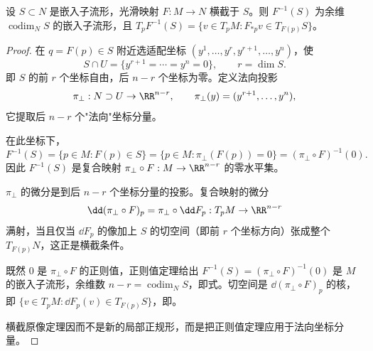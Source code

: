 \begin{theorem}[横截原像定理]
设 $S\subset N$ 是嵌入子流形，光滑映射 $F:M\to N$ 横截于 $S$。则 $F^{-1}(S)$ 为余维 $\operatorname{codim}_N S$ 的嵌入子流形，且 $T_pF^{-1}(S)=\{v\in T_pM:F_{*p}v\in T_{F(p)}S\}$。
\end{theorem}
\begin{proof}
在 $q=F(p)\in S$ 附近选适配坐标 $(y^1,\ldots,y^r,y^{r+1},\ldots,y^n)$，使
\begin{equation*}
 S\cap U=\{y^{r+1}=\cdots=y^n=0\},
 \qquad r=\dim S.
\end{equation*}
即 $S$ 的前 $r$ 个坐标自由，后 $n-r$ 个坐标为零。定义法向投影
\begin{equation*}
 \pi_\perp:N\supset U\to\RR^{n-r},
 \qquad
 \pi_\perp(y)=(y^{r+1},\ldots,y^n),
\end{equation*}
它提取后 $n-r$ 个"法向"坐标分量。

在此坐标下，
\begin{equation*}
 F^{-1}(S)=\{p\in M:F(p)\in S\}
 =\{p\in M:\pi_\perp(F(p))=0\}
 =(\pi_\perp\circ F)^{-1}(0).
\end{equation*}
因此 $F^{-1}(S)$ 是复合映射 $\pi_\perp\circ F:M\to\RR^{n-r}$ 的零水平集。

$\pi_\perp$ 的微分是到后 $n-r$ 个坐标分量的投影。复合映射的微分
\begin{equation*}
 \dd(\pi_\perp\circ F)_p=\pi_\perp\circ\dd F_p:T_pM\to\RR^{n-r}
\end{equation*}
满射，当且仅当 $\dd F_p$ 的像加上 $S$ 的切空间（即前 $r$ 个坐标方向）张成整个 $T_{F(p)}N$，这正是横截条件。

既然 $0$ 是 $\pi_\perp\circ F$ 的正则值，正则值定理给出 $F^{-1}(S)=(\pi_\perp\circ F)^{-1}(0)$ 是 $M$ 的嵌入子流形，余维数 $n-r=\operatorname{codim}_N S$，即式。切空间是 $\dd(\pi_\perp\circ F)_p$ 的核，即 $\{v\in T_pM:\dd F_p(v)\in T_{F(p)}S\}$，即。

横截原像定理因而不是新的局部正规形，而是把正则值定理应用于法向坐标分量。
\end{proof}

